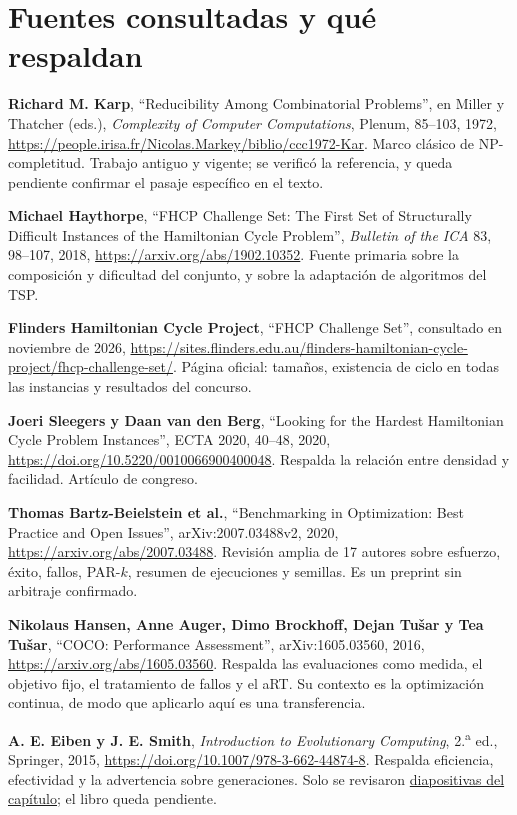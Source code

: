 \documentclass[letterpaper,12pt]{report}
\begin{document}
\section{Fuentes consultadas y qué respaldan}\label{sec:fuentes}
\begingroup\small
\begin{enumerate}[leftmargin=*,label={[\arabic*]},itemsep=3pt]
\item \textbf{Richard M. Karp}, ``Reducibility Among Combinatorial Problems'', en Miller y Thatcher (eds.), \emph{Complexity of Computer Computations}, Plenum, 85--103, 1972, \url{https://people.irisa.fr/Nicolas.Markey/biblio/ccc1972-Kar}. Marco clásico de NP-completitud. Trabajo antiguo y vigente; se verificó la referencia, y queda pendiente confirmar el pasaje específico en el texto.
\item \textbf{Michael Haythorpe}, ``FHCP Challenge Set: The First Set of Structurally Difficult Instances of the Hamiltonian Cycle Problem'', \emph{Bulletin of the ICA} 83, 98--107, 2018, \url{https://arxiv.org/abs/1902.10352}. Fuente primaria sobre la composición y dificultad del conjunto, y sobre la adaptación de algoritmos del TSP.
\item \textbf{Flinders Hamiltonian Cycle Project}, ``FHCP Challenge Set'', consultado en noviembre de 2026, \url{https://sites.flinders.edu.au/flinders-hamiltonian-cycle-project/fhcp-challenge-set/}. Página oficial: tamaños, existencia de ciclo en todas las instancias y resultados del concurso.
\item \textbf{Joeri Sleegers y Daan van den Berg}, ``Looking for the Hardest Hamiltonian Cycle Problem Instances'', ECTA 2020, 40--48, 2020, \url{https://doi.org/10.5220/0010066900400048}. Respalda la relación entre densidad y facilidad. Artículo de congreso.
\item \textbf{Thomas Bartz-Beielstein et al.}, ``Benchmarking in Optimization: Best Practice and Open Issues'', arXiv:2007.03488v2, 2020, \url{https://arxiv.org/abs/2007.03488}. Revisión amplia de 17 autores sobre esfuerzo, éxito, fallos, PAR-$k$, resumen de ejecuciones y semillas. Es un preprint sin arbitraje confirmado.
\item \textbf{Nikolaus Hansen, Anne Auger, Dimo Brockhoff, Dejan Tušar y Tea Tušar}, ``COCO: Performance Assessment'', arXiv:1605.03560, 2016, \url{https://arxiv.org/abs/1605.03560}. Respalda las evaluaciones como medida, el objetivo fijo, el tratamiento de fallos y el aRT. Su contexto es la optimización continua, de modo que aplicarlo aquí es una transferencia.
\item \textbf{A. E. Eiben y J. E. Smith}, \emph{Introduction to Evolutionary Computing}, 2.\textsuperscript{a} ed., Springer, 2015, \url{https://doi.org/10.1007/978-3-662-44874-8}. Respalda eficiencia, efectividad y la advertencia sobre generaciones. Solo se revisaron \href{https://cin.ufpe.br/~aluizioa/CE/CE-07-trabalhando-com-AEs-ch09-2014.pdf}{diapositivas del capítulo}; el libro queda pendiente.

\end{enumerate}
\end{document}
